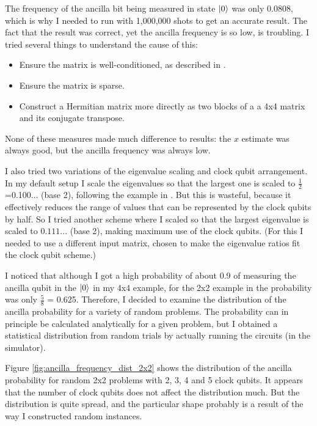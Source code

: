\documentclass[12pt]{extarticle}
\begin{document}
The frequency of the ancilla bit being measured in state $\ket{0}$ was only 0.0808, which is why I needed to run with 1,000,000 shots to get an accurate result.
The fact that the result was correct, yet the ancilla frequency is so low, is troubling.
I tried several things to understand the cause of this:
\begin{itemize}
\item Ensure the matrix is well-conditioned, as described in \cite{hhl2009}.
\item Ensure the matrix is sparse.
\item Construct a Hermitian matrix more directly as two blocks of a a 4x4 matrix and its conjugate transpose.
\end{itemize}
None of these measures made much difference to results: the $x$ estimate was always good, but the ancilla frequency was always low.

I also tried two variations of the eigenvalue scaling and clock qubit arrangement.
In my default setup I scale the eigenvalues so that the largest one is scaled to $\frac{1}{2}$=0.100... (base 2), following the example in \cite{zaman2023step}.
But this is wasteful, because it effectively reduces the range of values that can be represented by the clock qubits by half.
So I tried another scheme where I scaled so that the largest eigenvalue is scaled to $0.111...$ (base 2), making maximum use of the clock qubits.
(For this I needed to use a different input matrix, chosen to make the eigenvalue ratios fit the clock qubit scheme.)

I noticed that although I got a high probability of about 0.9 of measuring the ancilla qubit in the $\ket{0}$ in my 4x4 example,
for the 2x2 example in \cite{zaman2023step} the probability was only $\frac{5}{8}$ = 0.625.
Therefore, I decided to examine the distribution of the ancilla probability for a variety of random problems.
The probability can in principle be calculated analytically for a given problem, but I obtained a statistical distribution from random trials by actually running the circuits (in the simulator).

Figure \ref{fig:ancilla_frequency_dist_2x2} shows the distribution of the ancilla probability for random 2x2 problems with 2, 3, 4 and 5 clock qubits.
It appears that the number of clock qubits does not affect the distribution much.
But the distribution is quite spread, and the particular shape probably is a result of the way I constructed random instances.
\end{document}
